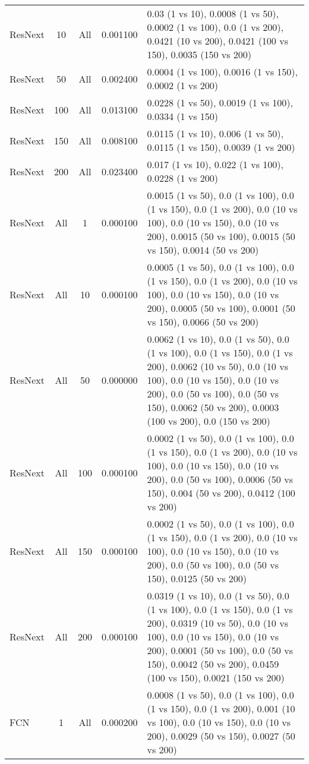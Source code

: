 \begin{tabular}{|l|c|c|c|p{7cm}|}
ResNext & 10 & All & 0.001100 & 0.03 (1 vs 10), 0.0008 (1 vs 50), 0.0002 (1 vs 100), 0.0 (1 vs 200), 0.0421 (10 vs 200), 0.0421 (100 vs 150), 0.0035 (150 vs 200) \\
ResNext & 50 & All & 0.002400 & 0.0004 (1 vs 100), 0.0016 (1 vs 150), 0.0002 (1 vs 200) \\
ResNext & 100 & All & 0.013100 & 0.0228 (1 vs 50), 0.0019 (1 vs 100), 0.0334 (1 vs 150) \\
ResNext & 150 & All & 0.008100 & 0.0115 (1 vs 10), 0.006 (1 vs 50), 0.0115 (1 vs 150), 0.0039 (1 vs 200) \\
ResNext & 200 & All & 0.023400 & 0.017 (1 vs 10), 0.022 (1 vs 100), 0.0228 (1 vs 200) \\
ResNext & All & 1 & 0.000100 & 0.0015 (1 vs 50), 0.0 (1 vs 100), 0.0 (1 vs 150), 0.0 (1 vs 200), 0.0 (10 vs 100), 0.0 (10 vs 150), 0.0 (10 vs 200), 0.0015 (50 vs 100), 0.0015 (50 vs 150), 0.0014 (50 vs 200) \\
ResNext & All & 10 & 0.000100 & 0.0005 (1 vs 50), 0.0 (1 vs 100), 0.0 (1 vs 150), 0.0 (1 vs 200), 0.0 (10 vs 100), 0.0 (10 vs 150), 0.0 (10 vs 200), 0.0005 (50 vs 100), 0.0001 (50 vs 150), 0.0066 (50 vs 200) \\
ResNext & All & 50 & 0.000000 & 0.0062 (1 vs 10), 0.0 (1 vs 50), 0.0 (1 vs 100), 0.0 (1 vs 150), 0.0 (1 vs 200), 0.0062 (10 vs 50), 0.0 (10 vs 100), 0.0 (10 vs 150), 0.0 (10 vs 200), 0.0 (50 vs 100), 0.0 (50 vs 150), 0.0062 (50 vs 200), 0.0003 (100 vs 200), 0.0 (150 vs 200) \\
ResNext & All & 100 & 0.000100 & 0.0002 (1 vs 50), 0.0 (1 vs 100), 0.0 (1 vs 150), 0.0 (1 vs 200), 0.0 (10 vs 100), 0.0 (10 vs 150), 0.0 (10 vs 200), 0.0 (50 vs 100), 0.0006 (50 vs 150), 0.004 (50 vs 200), 0.0412 (100 vs 200) \\
ResNext & All & 150 & 0.000100 & 0.0002 (1 vs 50), 0.0 (1 vs 100), 0.0 (1 vs 150), 0.0 (1 vs 200), 0.0 (10 vs 100), 0.0 (10 vs 150), 0.0 (10 vs 200), 0.0 (50 vs 100), 0.0 (50 vs 150), 0.0125 (50 vs 200) \\
ResNext & All & 200 & 0.000100 & 0.0319 (1 vs 10), 0.0 (1 vs 50), 0.0 (1 vs 100), 0.0 (1 vs 150), 0.0 (1 vs 200), 0.0319 (10 vs 50), 0.0 (10 vs 100), 0.0 (10 vs 150), 0.0 (10 vs 200), 0.0001 (50 vs 100), 0.0 (50 vs 150), 0.0042 (50 vs 200), 0.0459 (100 vs 150), 0.0021 (150 vs 200) \\
FCN & 1 & All & 0.000200 & 0.0008 (1 vs 50), 0.0 (1 vs 100), 0.0 (1 vs 150), 0.0 (1 vs 200), 0.001 (10 vs 100), 0.0 (10 vs 150), 0.0 (10 vs 200), 0.0029 (50 vs 150), 0.0027 (50 vs 200) \\

\end{tabular}

